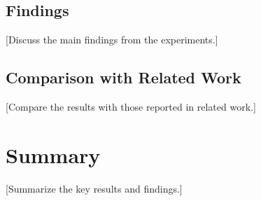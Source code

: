 \subsection{Findings}
\label{subsec:findings}

[Discuss the main findings from the experiments.]

\subsection{Comparison with Related Work}
\label{subsec:comparison}

[Compare the results with those reported in related work.]

\section{Summary}
\label{sec:results-summary}

[Summarize the key results and findings.]
